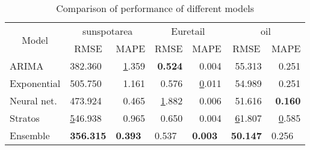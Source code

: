 \begin{table}[]
\centering
\caption{Comparison of performance of different models}
\label{my-label}
\begin{tabular}{|l|l|r|r|r|r|r|}
\hline
\multicolumn{1}{|c|}{\multirow{2}{*}{Model}} & \multicolumn{2}{c|}{sunspotarea}                                  & \multicolumn{2}{c|}{Euretail}                                        & \multicolumn{2}{c|}{oil}                                              \\ \cline{2-7} 
\multicolumn{1}{|c|}{}                       & \multicolumn{1}{c|}{RMSE} & \multicolumn{1}{c|}{MAPE}             & \multicolumn{1}{c|}{RMSE}    & \multicolumn{1}{c|}{MAPE}             & \multicolumn{1}{c|}{RMSE}              & \multicolumn{1}{c|}{MAPE}    \\ \hline
ARIMA                                        & 382.360                 & {\ul 1.359}                         & \textbf{0.524}             & 0.004                               & 55.313                               & 0.251                      \\ \hline
Exponential                                  & 505.750                 & 1.161                               & 0.576                      & {\ul 0.011}                         & 54.989                               & 0.251                      \\ \hline
Neural net.                                  & 473.924                 & 0.465                               & {\ul 1.882}                & 0.006                               & 51.616                               & \textbf{0.160}             \\ \hline
Stratos                                      & {\ul 546.938}           & 0.965                               & 0.650                      & 0.004                               & {\ul 61.807}                         & {\ul 0.585}                \\ \hline
Ensemble                                     & \textbf{356.315}        & \multicolumn{1}{l|}{\textbf{0.393}} & \multicolumn{1}{l|}{0.537} & \multicolumn{1}{l|}{\textbf{0.003}} & \multicolumn{1}{l|}{\textbf{50.147}} & \multicolumn{1}{l|}{0.256} \\ \hline
\end{tabular}
\end{table}

